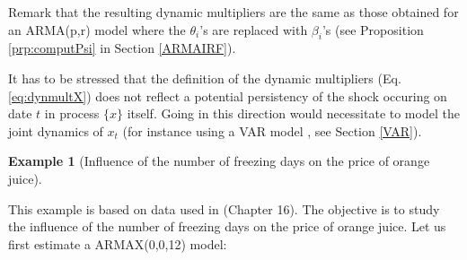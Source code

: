 \documentclass[
  12pt,
]{book}
\theoremstyle{definition}
\theoremstyle{definition}
\newtheorem{example}{Example}[chapter]
\theoremstyle{definition}
\theoremstyle{definition}
\theoremstyle{remark}
\begin{document}
Remark that the resulting dynamic multipliers are the same as those obtained for an ARMA(p,r) model where the \(\theta_i\)'s are replaced with \(\beta_i\)'s (see Proposition \ref{prp:computPsi} in Section \ref{ARMAIRF}).

It has to be stressed that the definition of the dynamic multipliers (Eq. \eqref{eq:dynmultX}) does not reflect a potential persistency of the shock occuring on date \(t\) in process \(\{x\}\) itself. Going in this direction would necessitate to model the joint dynamics of \(x_t\) (for instance using a VAR model , see Section \ref{VAR}).

\begin{example}[Influence of the number of freezing days on the price of orange juice]
\protect\hypertarget{exm:OrangeJuice}{}\label{exm:OrangeJuice}

This example is based on data used in \citet{Stock_Watson_2003} (Chapter 16). The objective is to study the influence of the number of freezing days on the price of orange juice. Let us first estimate a ARMAX(0,0,12) model:


\end{example}
\end{document}
